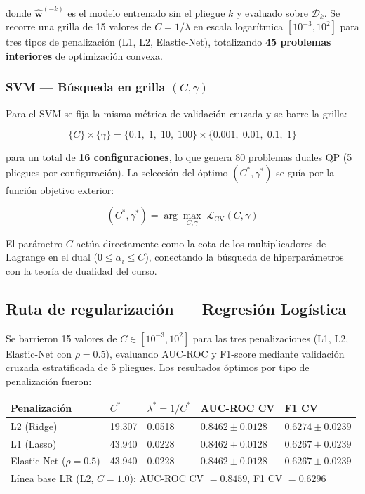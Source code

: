 \documentclass[spanish]{article}
\begin{document}
donde $\hat{\mathbf{w}}^{(-k)}$ es el modelo entrenado sin el pliegue $k$ y evaluado sobre $\mathcal{D}_k$. Se recorre una grilla de 15 valores de $C = 1/\lambda$ en escala logarítmica $[10^{-3}, 10^{2}]$ para tres tipos de penalización (L1, L2, Elastic-Net), totalizando \textbf{45 problemas interiores} de optimización convexa.

\subsubsection{SVM — Búsqueda en grilla $(C, \gamma)$}

Para el SVM se fija la misma métrica de validación cruzada y se barre la grilla:

\begin{equation}
\{C\} \times \{\gamma\} = \{0.1,\; 1,\; 10,\; 100\} \times \{0.001,\; 0.01,\; 0.1,\; 1\}
\end{equation}

para un total de \textbf{16 configuraciones}, lo que genera 80 problemas duales QP (5 pliegues por configuración). La selección del óptimo $(C^*, \gamma^*)$ se guía por la función objetivo exterior:

\begin{equation}
(C^*,\gamma^*) = \arg\max_{C,\gamma} \;\mathcal{L}_{\mathrm{CV}}(C, \gamma)
\end{equation}

El parámetro $C$ actúa directamente como la cota de los multiplicadores de Lagrange en el dual ($0 \leq \alpha_i \leq C$), conectando la búsqueda de hiperparámetros con la teoría de dualidad del curso.

\subsection{Ruta de regularización — Regresión Logística}

Se barrieron 15 valores de $C \in [10^{-3}, 10^{2}]$ para las tres penalizaciones (L1, L2, Elastic-Net con $\rho = 0.5$), evaluando AUC-ROC y F1-score mediante validación cruzada estratificada de 5 pliegues. Los resultados óptimos por tipo de penalización fueron:

\begin{center}
\begin{tabular}{lllll}
\toprule
\textbf{Penalización} & \textbf{$C^*$} & \textbf{$\lambda^* = 1/C^*$} & \textbf{AUC-ROC CV} & \textbf{F1 CV} \\
\midrule
L2 (Ridge)              & 19.307 & 0.0518 & $0.8462 \pm 0.0128$ & $0.6274 \pm 0.0239$ \\
L1 (Lasso)              & 43.940 & 0.0228 & $0.8462 \pm 0.0128$ & $0.6267 \pm 0.0239$ \\
Elastic-Net ($\rho=0.5$)& 43.940 & 0.0228 & $0.8462 \pm 0.0128$ & $0.6267 \pm 0.0239$ \\
\midrule
\multicolumn{5}{l}{\small Línea base LR (L2, $C=1.0$): AUC-ROC CV $= 0.8459$, \quad F1 CV $= 0.6296$} \\
\bottomrule
\end{tabular}
\end{center}
\end{document}
